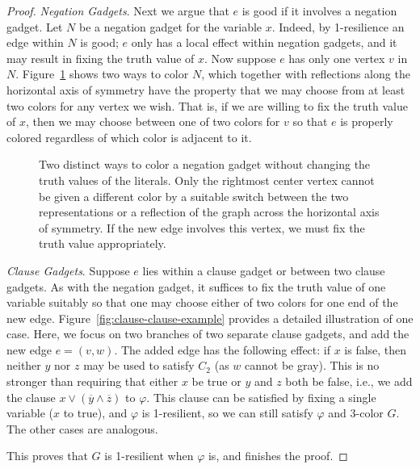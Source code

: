 \documentclass{llncs}
\begin{document}
\begin{proof}
\emph{Negation Gadgets}. Next we argue that $e$ is good if it involves a
negation gadget. Let $N$ be a negation gadget for the variable $x$. Indeed, by
1-resilience an edge within $N$ is good; $e$ only has a local effect within
negation gadgets, and it may result in fixing the truth value of $x$. Now
suppose $e$ has only one vertex $v$ in $N$. Figure~\ref{fig:coloring-negation}
shows two ways to color $N$, which together with reflections along the
horizontal axis of symmetry have the property that we may choose from at least
two colors for any vertex we wish. That is, if we are willing to fix the truth
value of $x$, then we may choose between one of two colors for $v$ so that $e$
is properly colored regardless of which color is adjacent to it.  

\begin{figure}
\centering
{}
\caption{Two distinct ways to color a negation gadget without changing the
truth values of the literals. Only the rightmost center vertex cannot be given
a different color by a suitable switch between the two representations or a
reflection of the graph across the horizontal axis of symmetry. If the new edge
involves this vertex, we must fix the truth value appropriately.}
\label{fig:coloring-negation} \end{figure}

\emph{Clause Gadgets}. Suppose $e$ lies within a clause gadget or between two
clause gadgets. As with the negation gadget, it suffices to fix the truth value
of one variable suitably so that one may choose either of two colors for one
end of the new edge. Figure~\ref{fig:clause-clause-example} provides a detailed
illustration of one case. Here, we focus on two branches of two separate clause
gadgets, and add the new edge $e = (v,w)$. The added edge has the following
effect: if $x$ is false, then neither $y$ nor $z$ may be used to satisfy $C_2$
(as $w$ cannot be gray). This is no stronger than requiring that either $x$ be
true or $y$ and $z$ both be false, i.e., we add the clause $x \vee
(\overline{y} \wedge \overline{z})$ to $\varphi$. This clause can be
satisfied by fixing a single variable ($x$ to true), and $\varphi$ is
1-resilient, so we can still satisfy $\varphi$ and 3-color $G$.  The other cases
are analogous.

This proves that $G$ is 1-resilient when $\varphi$ is, and finishes the proof.
\end{proof}
\end{document}

